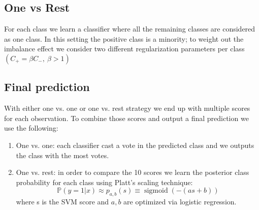 \documentclass{acmsiggraph}
\DeclareMathOperator\sigmoid{sigmoid}
\newcommand{\1}{\mathbf{1}}
\newcommand{\0}{\mathbf{0}}
\newcommand{\p}{\mathbb{P}}
\begin{document}
\subsection{One vs Rest}
For each class we learn a classifier where all the remaining classes are considered as one class. In this setting the positive class is a minority; to weight out the imbalance effect we consider two different regularization parameters per class $(C_+ = \beta C_-,\:\beta>1)$
\subsection{Final prediction}
With either one vs. one or one vs. rest strategy we end up with multiple scores for each observation. To combine those scores and output a final prediction we use the following:
\begin{enumerate}[label=$\bullet$]
\item One vs. one: each classifier cast a vote in the predicted class and we outputs the class with the most votes.
\item One vs. rest: in order to compare the 10 scores we learn the posterior class probability for each class using Platt's scaling technique:
\[\p(y=1|x) \approx p_{a,b}(s) \equiv \sigmoid(-(as+b))\]
where s is the SVM score and $a,b$ are optimized via logistic regression.
\end{enumerate}
\end{document}

